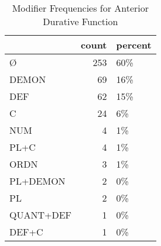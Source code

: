 \begin{table}[htbp!]
\centering
\caption{Modifier Frequencies for Anterior Durative Function}
\label{table:antdur_mod_cp}
\begin{tabular}{lrl}
\toprule
{} &  count & percent \\
\midrule
Ø         &    253 &     60\% \\
DEMON     &     69 &     16\% \\
DEF       &     62 &     15\% \\
C         &     24 &      6\% \\
NUM       &      4 &      1\% \\
PL+C      &      4 &      1\% \\
ORDN      &      3 &      1\% \\
PL+DEMON  &      2 &      0\% \\
PL        &      2 &      0\% \\
QUANT+DEF &      1 &      0\% \\
DEF+C     &      1 &      0\% \\
\bottomrule
\end{tabular}
\end{table}
